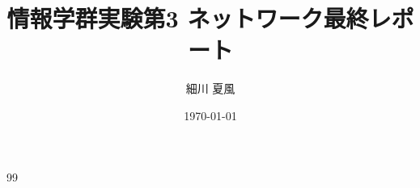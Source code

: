 \documentclass{jlreq}
\title{情報学群実験第3 ネットワーク最終レポート}
\author{細川 夏風}
\date{\today}
\begin{document}
  \maketitle

\begin{thebibliography}{99}
  
\end{thebibliography}
\end{document}
